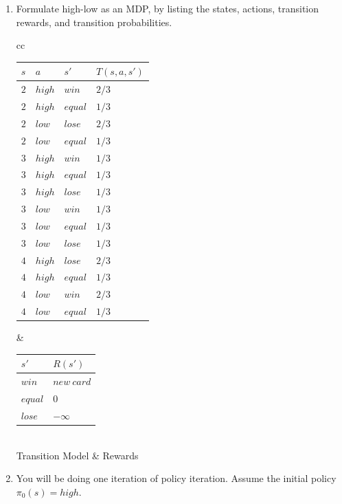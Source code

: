 \documentclass[12pt]{article}
\begin{document}
\begin{enumerate}

\item Formulate high-low as an MDP, by listing the states, actions,
  transition rewards, and transition probabilities.  

\begin{center}
\begin{tabular}{cc}
\begin{tabular}{|l|l|l|l|} \hline
$s$ & $a$ & $s'$ & $T(s,a,s')$ \\ \hline
$2$ & $high$ & $win$ & $2/3$ \\ \hline
$2$ & $high$ & $equal$ & $1/3$ \\ \hline
$2$ & $low$  & $lose$ & $2/3$ \\ \hline
$2$ & $low$  & $equal$ & $1/3$ \\ \hline
$3$ & $high$ & $win$   & $1/3$ \\ \hline
$3$ & $high$ & $equal$   & $1/3$ \\ \hline
$3$ & $high$ & $lose$ & $1/3$ \\ \hline
$3$ & $low$ & $win$   & $1/3$ \\ \hline
$3$ & $low$ & $equal$   & $1/3$ \\ \hline
$3$ & $low$ & $lose$ & $1/3$ \\ \hline
$4$ & $high$ & $lose$ & $2/3$ \\ \hline
$4$ & $high$ & $equal$ & $1/3$ \\ \hline
$4$ & $low$  & $win$ & $2/3$ \\ \hline
$4$ & $low$  & $equal$ & $1/3$ \\ \hline
\end{tabular} &
\begin{tabular}{|l|l|}\hline
$s'$       & $R(s')$ \\ \hline
$win$ & $new\ card$ \\  \hline
$equal$  &  $0$ \\ \hline
$lose$ & $-\infty$  \\ \hline
\end{tabular} \\
Transition Model & Rewards
\end{tabular}
\end{center}

\item You will be doing one iteration of policy iteration.  Assume the
  initial policy $\pi_0(s) = high$.

  \begin{enumerate}


\end{enumerate}
\end{enumerate}
\end{document}
